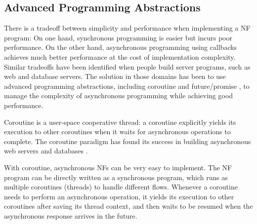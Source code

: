 
\subsection{Advanced Programming Abstractions}

There is a tradeoff between simplicity and performance when implementing a NF program: On one hand, synchronous programming is easier but incurs poor performance. On the other hand, asynchronous programming using callbacks achieves much better performance at the cost of implementation complexity. Similar tradeoffs have been identified when people build server programs, such as web \cite{tornado-web-server} and database servers\cite{rethinkdb}.
The solution in those domains has been to use advanced programming abstractions, including coroutine \cite{coroutine} and future/promise \cite{claessen1999poor, li2007combining, wtf, syme2011f}, to manage the complexity of asynchronous programming while achieving good performance.


Coroutine is a user-space cooperative thread: a coroutine explicitly yields its execution to other coroutines when it waits for asynchronous operations to complete. The coroutine paradigm has found its success in building asynchronous web servers \cite{tornado-web-server} and databases \cite{rethinkdb}. %

With coroutine, asynchronous NFs can be very easy to implement. The NF program can be directly written as a synchronous program, which runs as multiple coroutines (threads) to handle different flows. Whenever a coroutine needs to perform an asynchronous operation, it yields its execution to other coroutines after saving its thread context, and then waits to be resumed when the asynchronous response arrives in the future.

